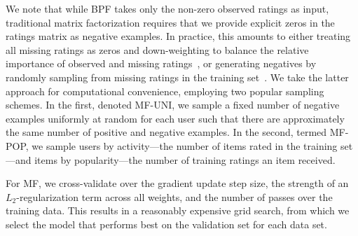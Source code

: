 We note that while BPF takes only the non-zero observed ratings as
input, traditional matrix factorization requires that we provide
explicit zeros in the ratings matrix as negative examples. In
practice, this amounts to either treating all missing ratings as zeros
and down-weighting to balance the relative importance of observed and
missing ratings~\cite{Hu:2008p9402}, or generating negatives by
randomly sampling from missing ratings in the training
set~\cite{Dror:2012a}.  We take the latter approach for computational
convenience, employing two popular sampling schemes. In the first,
denoted MF-UNI, we sample a fixed number of negative examples
uniformly at random for each user such that there are approximately
the same number of positive and negative examples. In the second,
termed MF-POP, we sample users by activity---the number of items rated
in the training set---and items by popularity---the number of training
ratings an item received. 

For MF, we cross-validate over the gradient update step size, the
strength of an $L_2$-regularization term across all weights, and the
number of passes over the training data. This results in a reasonably
expensive grid search, from which we select
the model that performs best on the validation set for each data set.




